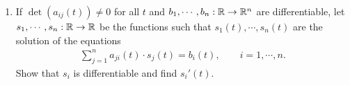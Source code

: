 \begin{problems}
{\begin{enumerate}[label={\upshape(\alph*)}]
\begin{align*}
{\begin{matrix}
                        a_{n1}(t) & \cdots & a_{nn}(t)
                    \end{matrix}\right)}
                \end{align*}
            \item If $\det (a_{ij}(t)) \neq 0$ for all $t$ and $b_1, \cdots, b_n:\mathbb{R}\to \mathbb{R}^n$ are 
                differentiable, let $s_1, \cdots, s_n:\mathbb{R}\to \mathbb{R}$ be the functions such that $s_1(t), \cdots, s_n(t)$
                are the solution of the equations 
                \begin{align*}
                    \sum_{j=1}^{n}{a_{ji}(t)\cdot s_j(t)} = b_i(t),\qquad i=1, \cdots, n.
                \end{align*}
                Show that $s_i$ is differentiable and find $s_i'(t)$.
        \end{enumerate}
        }
\end{problems}
